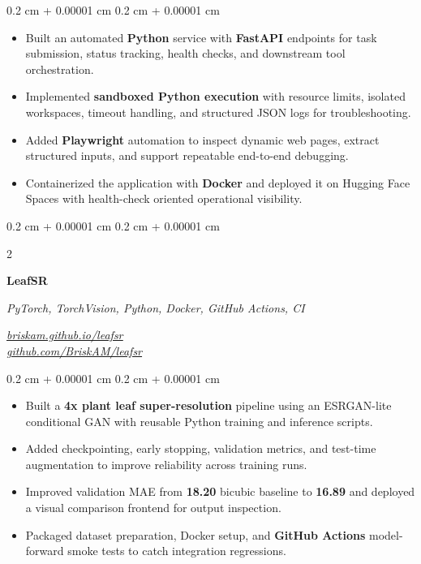 \documentclass[10pt, letterpaper]{article}
\newenvironment{highlights}{
    \begin{itemize}[
        topsep=0.02 cm,
        parsep=0.02 cm,
        partopsep=0pt,
        itemsep=0pt,
        leftmargin=0.4 cm + 10pt
    ]
}{
    \end{itemize}
} %
\newenvironment{onecolentry}{
    \begin{adjustwidth}{
        0.2 cm + 0.00001 cm
    }{
        0.2 cm + 0.00001 cm
    }
}{
    \end{adjustwidth}
} %
\newenvironment{twocolentry}[2][]{
    \onecolentry
    \def\secondColumn{#2}
    \setcolumnwidth{\fill, 6.8 cm}
    \begin{paracol}{2}
}{
    \switchcolumn \raggedleft \secondColumn
    \end{paracol}
    \endonecolentry
} %
\let\hrefWithoutArrow\href
\renewcommand{\href}[2]{\hrefWithoutArrow{#1}{\uline{#2}}}
\newcommand{\printlink}[2]{\href{#1}{#2}}
\begin{document}
        \vspace{0.02 cm}
        \begin{onecolentry}
            \begin{highlights}
                \item Built an automated \textbf{Python} service with \textbf{FastAPI} endpoints for task submission, status tracking, health checks, and downstream tool orchestration.
                \item Implemented \textbf{sandboxed Python execution} with resource limits, isolated workspaces, timeout handling, and structured JSON logs for troubleshooting.
                \item Added \textbf{Playwright} automation to inspect dynamic web pages, extract structured inputs, and support repeatable end-to-end debugging.
                \item Containerized the application with \textbf{Docker} and deployed it on Hugging Face Spaces with health-check oriented operational visibility.
            \end{highlights}
        \end{onecolentry}

        \vspace{0.10 cm}

        \begin{twocolentry}{
        \textit{\footnotesize \printlink{https://briskam.github.io/leafsr}{briskam.github.io/leafsr}\\\printlink{https://github.com/BriskAM/leafsr}{github.com/BriskAM/leafsr}}}
            \textbf{LeafSR}

            \textit{PyTorch, TorchVision, Python, Docker, GitHub Actions, CI}
        \end{twocolentry}

        \vspace{0.02 cm}
        \begin{onecolentry}
            \begin{highlights}
                \item Built a \textbf{4x plant leaf super-resolution} pipeline using an ESRGAN-lite conditional GAN with reusable Python training and inference scripts.
                \item Added checkpointing, early stopping, validation metrics, and test-time augmentation to improve reliability across training runs.
                \item Improved validation MAE from \textbf{18.20} bicubic baseline to \textbf{16.89} and deployed a visual comparison frontend for output inspection.
                \item Packaged dataset preparation, Docker setup, and \textbf{GitHub Actions} model-forward smoke tests to catch integration regressions.
            \end{highlights}
        \end{onecolentry}
\end{document}

